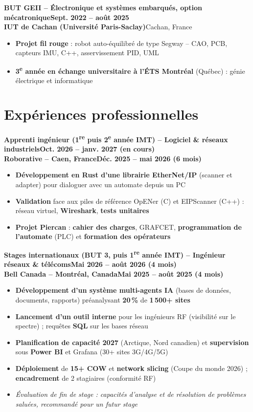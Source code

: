 \documentclass[11pt,a4paper]{article}
\newcommand{\entree}[4]{{\setstretch{1}%
  \textbf{\color{sage}#1}\hfill\textbf{#2}\\
  {\color{imtblue}\textbf{#3}}\hfill{\small #4}\par}\vspace{1pt}}
\begin{document}
\entree{BUT GEII -- Électronique et systèmes embarqués, option mécatronique}{Sept. 2022 -- août 2025}{IUT de Cachan (Université Paris-Saclay)}{Cachan, France}
\begin{itemize}
  \item \textbf{Projet fil rouge} : robot auto-équilibré de type Segway -- CAO, PCB, capteurs IMU, C++, asservissement PID, UML
  \item \textbf{3\textsuperscript{e} année en échange universitaire à l'ÉTS Montréal} (Québec) : génie électrique et informatique
\end{itemize}

\section{Expériences professionnelles}

\entree{Apprenti ingénieur (1\textsuperscript{re} puis 2\textsuperscript{e} année IMT) -- Logiciel \& réseaux industriels}{Oct. 2026 -- janv. 2027 (en cours)}{Roborative -- Caen, France}{\textbf{\normalsize Déc. 2025 -- mai 2026 (6 mois)}}
\begin{itemize}
  \item \textbf{Développement en Rust d'une librairie EtherNet/IP} (scanner et adapter) pour dialoguer avec un automate depuis un PC
  \item \textbf{Validation} face aux piles de référence OpENer (C) et EIPScanner (C++) : réseau virtuel, \textbf{Wireshark}, \textbf{tests unitaires}
  \item \textbf{Projet Piercan} : \textbf{cahier des charges}, GRAFCET, \textbf{programmation de l'automate} (PLC) et \textbf{formation des opérateurs}
\end{itemize}
\vspace{2pt}

\entree{Stages internationaux (BUT 3, puis 1\textsuperscript{re} année IMT) -- Ingénieur réseaux \& télécoms}{Mai 2026 -- août 2026 (4 mois)}{Bell Canada -- Montréal, Canada}{\textbf{\normalsize Mai 2025 -- août 2025 (4 mois)}}
\begin{itemize}
  \item \textbf{Développement d'un système multi-agents IA} (bases de données, documents, rapports) préanalysant \textbf{20\,\%} de \textbf{1\,500+ sites}
  \item \textbf{Lancement d'un outil interne} pour les ingénieurs RF (visibilité sur le spectre) ; requêtes \textbf{SQL} sur les bases réseau
  \item \textbf{Planification de capacité 2027} (Arctique, Nord canadien) et \textbf{supervision} sous \textbf{Power BI} et Grafana (30+ sites 3G/4G/5G)
  \item \textbf{Déploiement} de \textbf{15+ COW} et \textbf{network slicing} (Coupe du monde 2026) ; \textbf{encadrement} de 2 stagiaires (conformité RF)
  \item \textit{Évaluation de fin de stage : capacités d'analyse et de résolution de problèmes saluées, recommandé pour un futur stage}
\end{itemize}
\vspace{2pt}
\end{document}
